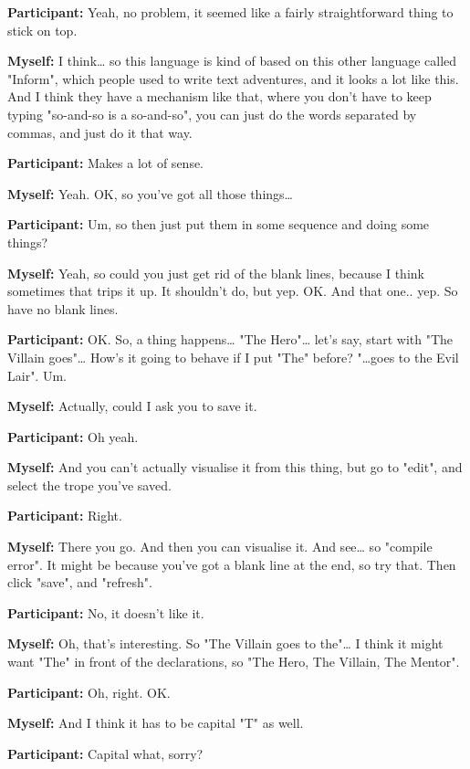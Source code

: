 \documentclass[11pt]{report}
\begin{document}
\begin{linenumbers}
\textbf{Participant:} Yeah, no problem, it seemed like a fairly straightforward thing to stick on top.

\textbf{Myself:} I think\ldots{} so this language is kind of based on this other language called "Inform", which people used to write text adventures, and it looks a lot like this. And I think they have a mechanism like that, where you don't have to keep typing "so-and-so is a so-and-so", you can just do the words separated by commas, and just do it that way.

\textbf{Participant:} Makes a lot of sense.

\textbf{Myself:} Yeah. OK, so you've got all those things\ldots{}

\textbf{Participant:} Um, so then just put them in some sequence and doing some things?

\textbf{Myself:} Yeah, so could you just get rid of the blank lines, because I think sometimes that trips it up. It shouldn't do, but yep. OK. And that one.. yep. So have no blank lines.

\textbf{Participant:} OK. So, a thing happens\ldots{} "The Hero"\ldots{} let's say, start with "The Villain goes"\ldots{} How's it going to behave if I put "The" before? "\ldots{}goes to the Evil Lair". Um.

\textbf{Myself:} Actually, could I ask you to save it.

\textbf{Participant:} Oh yeah.

\textbf{Myself:} And you can't actually visualise it from this thing, but go to "edit", and select the trope you've saved.

\textbf{Participant:} Right.

\textbf{Myself:} There you go. And then you can visualise it. And see\ldots{} so "compile error". It might be because you've got a blank line at the end, so try that. Then click "save", and "refresh".

\textbf{Participant:} No, it doesn't like it.

\textbf{Myself:} Oh, that's interesting. So "The Villain goes to the"\ldots{} I think it might want "The" in front of the declarations, so "The Hero, The Villain, The Mentor".

\textbf{Participant:} Oh, right. OK.

\textbf{Myself:} And I think it has to be capital "T" as well.

\textbf{Participant:} Capital what, sorry?


\end{linenumbers}
\end{document}
